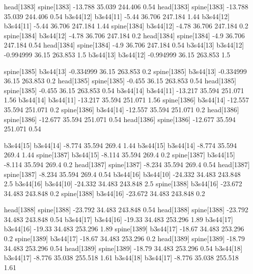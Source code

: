 head[1383]    spine[1383]    -13.788    35.039    244.406    0.54
head[1383]    spine[1383]    -13.788    35.039    244.406    0.54
b3s44[12]    b3s44[11]    -5.44    36.706    247.184    1.44
b3s44[12]    b3s44[11]    -5.44    36.706    247.184    1.44
spine[1384]    b3s44[12]    -4.78    36.706    247.184    0.2
spine[1384]    b3s44[12]    -4.78    36.706    247.184    0.2
head[1384]    spine[1384]    -4.9    36.706    247.184    0.54
head[1384]    spine[1384]    -4.9    36.706    247.184    0.54
b3s44[13]    b3s44[12]    -0.994999    36.15    263.853    1.5
b3s44[13]    b3s44[12]    -0.994999    36.15    263.853    1.5


spine[1385]    b3s44[13]    -0.334999    36.15    263.853    0.2
spine[1385]    b3s44[13]    -0.334999    36.15    263.853    0.2
head[1385]    spine[1385]    -0.455    36.15    263.853    0.54
head[1385]    spine[1385]    -0.455    36.15    263.853    0.54
b3s44[14]    b3s44[11]    -13.217    35.594    251.071    1.56
b3s44[14]    b3s44[11]    -13.217    35.594    251.071    1.56
spine[1386]    b3s44[14]    -12.557    35.594    251.071    0.2
spine[1386]    b3s44[14]    -12.557    35.594    251.071    0.2
head[1386]    spine[1386]    -12.677    35.594    251.071    0.54
head[1386]    spine[1386]    -12.677    35.594    251.071    0.54


b3s44[15]    b3s44[14]    -8.774    35.594    269.4    1.44
b3s44[15]    b3s44[14]    -8.774    35.594    269.4    1.44
spine[1387]    b3s44[15]    -8.114    35.594    269.4    0.2
spine[1387]    b3s44[15]    -8.114    35.594    269.4    0.2
head[1387]    spine[1387]    -8.234    35.594    269.4    0.54
head[1387]    spine[1387]    -8.234    35.594    269.4    0.54
b3s44[16]    b3s44[10]    -24.332    34.483    243.848    2.5
b3s44[16]    b3s44[10]    -24.332    34.483    243.848    2.5
spine[1388]    b3s44[16]    -23.672    34.483    243.848    0.2
spine[1388]    b3s44[16]    -23.672    34.483    243.848    0.2


head[1388]    spine[1388]    -23.792    34.483    243.848    0.54
head[1388]    spine[1388]    -23.792    34.483    243.848    0.54
b3s44[17]    b3s44[16]    -19.33    34.483    253.296    1.89
b3s44[17]    b3s44[16]    -19.33    34.483    253.296    1.89
spine[1389]    b3s44[17]    -18.67    34.483    253.296    0.2
spine[1389]    b3s44[17]    -18.67    34.483    253.296    0.2
head[1389]    spine[1389]    -18.79    34.483    253.296    0.54
head[1389]    spine[1389]    -18.79    34.483    253.296    0.54
b3s44[18]    b3s44[17]    -8.776    35.038    255.518    1.61
b3s44[18]    b3s44[17]    -8.776    35.038    255.518    1.61


